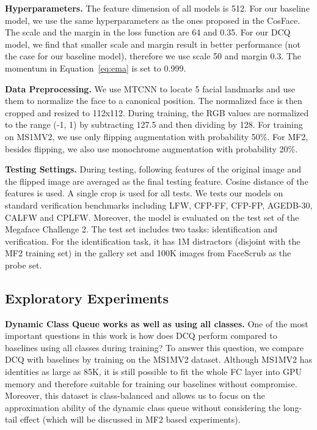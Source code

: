 \documentclass[10pt,twocolumn,letterpaper]{article}
\begin{document}
\textbf{Hyperparameters.} The feature dimension of all models is 512. For our baseline model, we use the same hyperparameters as the ones proposed in the CosFace\cite{wang2018cosface}. The scale and the margin in the loss function are 64 and 0.35. For our DCQ model, we find that smaller scale and margin result in better performance (not the case for our baseline model), therefore we use scale 50 and margin 0.3. The momentum  in Equation~\ref{eq:ema} is set to 0.999.

\textbf{Data Preprocessing.} We use MTCNN\cite{zhang2016joint} to locate 5 facial landmarks and use them to normalize the face to a canonical position. The normalized face is then cropped and resized to 112x112. During training, the RGB values are normalized to the range (-1, 1) by subtracting 127.5 and then dividing by 128. For training on MS1MV2, we use only flipping augmentation with probability 50\%. For MF2, besides flipping, we also use monochrome augmentation with probability 20\%.

\textbf{Testing Settings.} During testing, following \cite{deng2019arcface} features of the original image and the flipped image are averaged as the final testing feature. Cosine distance of the features is used. A single crop is used for all tests. We tests our models on standard verification benchmarks including LFW\cite{LFWTech}, CFP-FF, CFP-FP\cite{sengupta2016frontal}, AGEDB-30\cite{moschoglou2017agedb}, CALFW\cite{DBLP:journals/corr/abs-1708-08197} and CPLFW\cite{zheng2018cross}. Moreover, the model is evaluated on the test set of the Megaface Challenge 2. The test set includes two tasks: identification and verification. For the identification task, it has 1M distractors (disjoint with the MF2 training set) in the gallery set and 100K images from FaceScrub\cite{ng2014data} as the probe set.

\subsection{Exploratory Experiments}
\textbf{Dynamic Class Queue works as well as using all classes.} One of the most important questions in this work is how does DCQ perform compared to baselines using all classes during training? To answer this question, we compare DCQ with baselines by training on the MS1MV2 dataset. Although MS1MV2 has identities as large as 85K, it is still possible to fit the whole FC layer into GPU memory and therefore suitable for training our baselines without compromise. Moreover, this dataset is class-balanced and allows us to focus on the approximation ability of the dynamic class queue without considering the long-tail effect (which will be discussed in MF2 based experiments).
\end{document}

